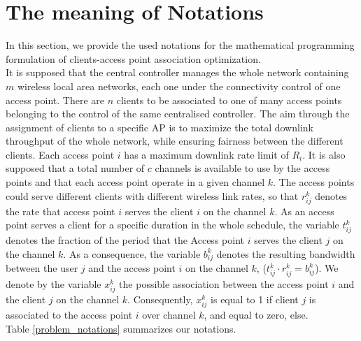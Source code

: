 \documentclass[journal,transmag]{IEEEtran}
\begin{document}
\section{The meaning of Notations}
\label{used notations}
In this section, we provide the used notations for the mathematical programming formulation of clients-access point association optimization. \\

It is supposed that the central controller manages the whole network containing $m$ wireless local area networks, each one under the connectivity control of one access point. There are $n$ clients to be associated to one of many access points belonging to the control of the same centralised controller. The aim through the assignment of clients to a specific AP is to maximize the total downlink throughput of the whole network, while ensuring fairness between the different clients. Each access point $i$ has a maximum downlink rate limit of $R_i$. It is also supposed that a total number of $c$ channels is available to use by the access points and that each access point operate in a given channel $k$. The access points could serve different clients with different wireless link rates, so that $r_{ij}^k$ denotes the rate that access point $i$ serves the client $i$ on the channel $k$. As an access point serves a client for a specific duration in the whole schedule, the variable $t_{ij}^k$ denotes the fraction of the period that the Access point $i$ serves the client $j$ on the channel $k$. As a consequence, the variable $b_{ij}^k$ denotes the resulting bandwidth between the user $j$ and the access point $i$ on the channel $k$, ($t_{ij}^k \cdot r_{ij}^k = b_{ij}^k$). We denote by the variable $x_{ij}^k$ the possible association between the access point $i$ and the client $j$ on the channel $k$. Consequently, $x_{ij}^k$ is equal to 1 if client $j$ is associated to the access point $i$ over channel $k$, and equal to zero, else. \\


Table \ref{problem_notations} summarizes our notations. \\
\end{document}

